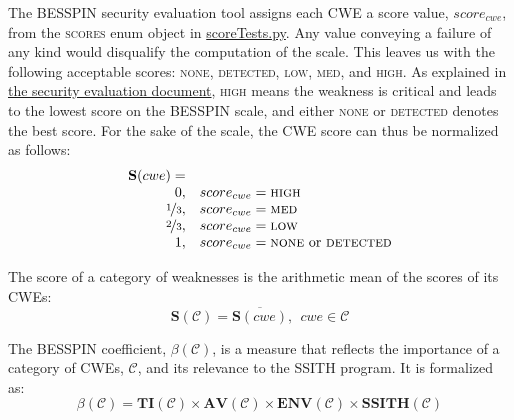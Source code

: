 \documentclass{article}
\begin{document}
The BESSPIN security evaluation tool assigns each CWE a score value, $score_{cwe}$, from the {\scshape scores} enum object in \href{https://github.com/DARPA-SSITH-Demonstrators/SSITH-FETT-Target/blob/develop/fett/cwesEvaluation/scoreTests.py}{scoreTests.py}. Any value conveying a failure of any kind would disqualify the computation of the scale. This leaves us with the following acceptable scores: {\scshape none}, {\scshape detected}, {\scshape low}, {\scshape med}, and {\scshape high}. As explained in \href{https://github.com/DARPA-SSITH-Demonstrators/SSITH-FETT-Target/blob/develop/docs/evaluateSecurityTestsMode.md}{the security evaluation document}, {\scshape high} means the weakness is critical and leads to the lowest score on the BESSPIN scale, and either {\scshape none} or {\scshape detected} denotes the best score. For the sake of the scale, the CWE score can thus be normalized as follows:
\begin{equation}
\begin{array}{rl}
\mathbf{S}(cwe) = \\ 
      0, &   score_{cwe} = \text{{\scshape high}} \\
      \nicefrac{1}{3}, & score_{cwe} = \text{{\scshape med}} \\
      \nicefrac{2}{3}, & score_{cwe} = \text{{\scshape low}} \\
      1, &    score_{cwe} = \text{{\scshape none} or {\scshape detected}}
\end{array}
\end{equation}

The score of a category of weaknesses is the arithmetic mean of the scores of its CWEs:
\begin{equation}
    \mathbf{S}(\mathcal{C}) = \overline{\mathbf{S}(cwe)}, \ \ cwe \in \mathcal{C}
\end{equation}

The BESSPIN coefficient, $\beta(\mathcal{C})$, is a measure that reflects the importance of a category of CWEs, $\mathcal{C}$, and its relevance to the SSITH program. It is formalized as: 
\begin{equation}
    \beta(\mathcal{C}) = \mathbf{TI}(\mathcal{C}) 
    \times \mathbf{AV}(\mathcal{C}) 
    \times \mathbf{ENV}(\mathcal{C}) 
    \times \mathbf{SSITH}(\mathcal{C})
\end{equation}
\end{document}
